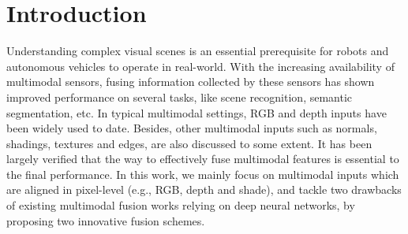 \documentclass[sigconf]{acmart}
\begin{document}



\maketitle



\renewcommand*{\thefootnote}{\fnsymbol{footnote}}
\renewcommand*{\thefootnote}{\arabic{footnote}}

\section{Introduction}
\label{intro}

Understanding complex visual scenes is an essential prerequisite for robots and autonomous vehicles to operate in real-world. With the increasing availability of multimodal sensors, fusing information collected by these sensors has shown improved performance on several tasks, like scene recognition, semantic segmentation, etc. In typical multimodal settings, RGB and depth inputs have been widely used to date. Besides, other multimodal inputs such as  normals, shadings, textures and edges, are also discussed to some extent. It has been largely verified that the way to effectively fuse multimodal features is essential to the final performance.  In this work, we mainly focus on multimodal inputs which are aligned in pixel-level (e.g., RGB, depth and shade), and tackle two drawbacks of existing multimodal fusion works relying on deep neural networks, by proposing two innovative fusion schemes.
\end{document}
